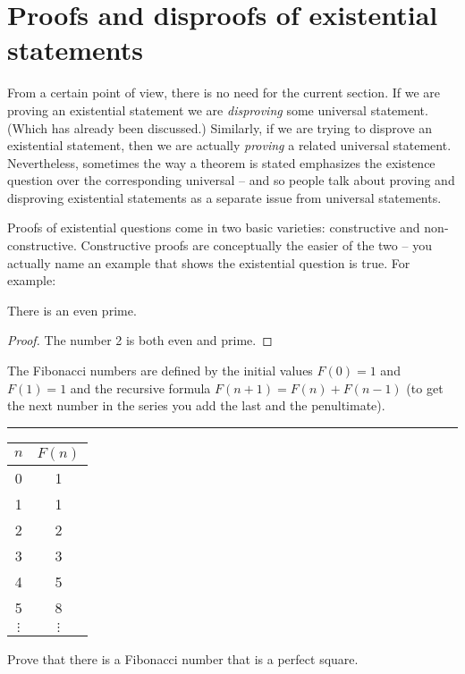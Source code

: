 \clearpage





\newpage

\section[Existential statements]{Proofs and disproofs of existential statements}
\label{sec:exist}

From a certain point of view, there is no need for the current section.
If we are proving an existential statement we are \emph{disproving} some
universal statement. (Which has already been discussed.)  Similarly,
if we are trying to disprove an existential statement, then we are
actually \emph{proving} a related universal statement.  Nevertheless,
sometimes the way a theorem is stated emphasizes the existence question
over the corresponding universal -- and so people talk about proving
and disproving existential statements as a separate issue from 
universal statements.

Proofs of existential questions come in two basic varieties: constructive
and non-constructive.  Constructive proofs are conceptually the easier
of the two -- you actually name an example that shows the existential
question is true.  For example:

\begin{thm}
There is an even prime.
\end{thm}

\begin{proof}
The number 2 is both even and prime. 
\end{proof} 

\begin{exer}
The Fibonacci numbers are defined by the initial values $F(0)=1$
and $F(1)=1$ and the recursive formula $F(n+1) = F(n)+F(n-1)$ (to
get the next number in the series you add the last and the penultimate).

\rule{72pt}{0pt} \begin{tabular}{c|c}
$n$ & $F(n)$ \\ \hline
0 & 1 \\
1 & 1 \\
2 & 2 \\
3 & 3 \\
4 & 5 \\
5 & 8 \\
$\vdots$ & $\vdots$\\
\end{tabular}
\medskip

Prove that there is a Fibonacci number that is a perfect square.
\end{exer}

